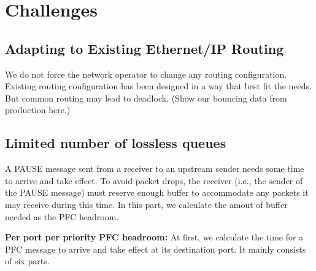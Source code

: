 \section{Challenges}\label{sec:challenges}

\subsection{Adapting to Existing Ethernet/IP Routing}

We do not force the network operator to change any routing configuration. Existing routing configuration has been designed in a way that 
best fit the needs. But common routing may lead to deadlock. (Show our bouncing data from production here.)

\subsection{Limited number of lossless queues}\label{subsec:pfcheadroom}


A PAUSE message sent from a receiver to an upstream sender needs some time to arrive and take effect. To avoid packet drops, the receiver (i.e., the sender of the PAUSE message) must reserve enough buffer to accommodate any packets it may receive during this time. In this part, we calculate the amout of buffer needed as the PFC headroom.

\textbf{Per port per priority PFC headroom:} At first, we calculate the time for a PFC message to arrive and take effect at its destination port. It mainly consists of six parts.

